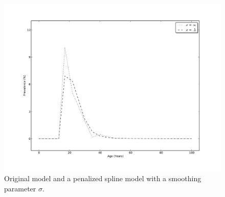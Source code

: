     \begin{figure}[h]
        \begin{center}
            \includegraphics[width=\textwidth]{applications/cannabis_dependence-smoothing.pdf}
            \caption{Original model and a penalized spline model with a smoothing parameter $\sigma$. }
        \label{fig:app-cannabis_smoothing}
        \end{center}
    \end{figure}

